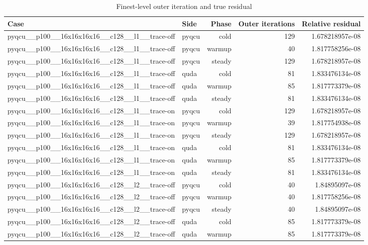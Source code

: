 \begin{table}[htbp]
\centering
\caption{Finest-level outer iteration and true residual}
\small
\begin{tabular}{@{}llrrr@{}}
\toprule
Case & Side & Phase & Outer iterations & Relative residual \\
\midrule
pyqcu\_\_p100\_\_16x16x16x16\_\_c128\_\_l1\_\_trace-off & pyqcu & cold & 129 & 1.678218957e-08 \\
pyqcu\_\_p100\_\_16x16x16x16\_\_c128\_\_l1\_\_trace-off & pyqcu & warmup & 40 & 1.817758256e-08 \\
pyqcu\_\_p100\_\_16x16x16x16\_\_c128\_\_l1\_\_trace-off & pyqcu & steady & 129 & 1.678218957e-08 \\
pyqcu\_\_p100\_\_16x16x16x16\_\_c128\_\_l1\_\_trace-off & quda & cold & 81 & 1.833476134e-08 \\
pyqcu\_\_p100\_\_16x16x16x16\_\_c128\_\_l1\_\_trace-off & quda & warmup & 85 & 1.817773379e-08 \\
pyqcu\_\_p100\_\_16x16x16x16\_\_c128\_\_l1\_\_trace-off & quda & steady & 81 & 1.833476134e-08 \\
pyqcu\_\_p100\_\_16x16x16x16\_\_c128\_\_l1\_\_trace-on & pyqcu & cold & 129 & 1.678218957e-08 \\
pyqcu\_\_p100\_\_16x16x16x16\_\_c128\_\_l1\_\_trace-on & pyqcu & warmup & 39 & 1.817754938e-08 \\
pyqcu\_\_p100\_\_16x16x16x16\_\_c128\_\_l1\_\_trace-on & pyqcu & steady & 129 & 1.678218957e-08 \\
pyqcu\_\_p100\_\_16x16x16x16\_\_c128\_\_l1\_\_trace-on & quda & cold & 81 & 1.833476134e-08 \\
pyqcu\_\_p100\_\_16x16x16x16\_\_c128\_\_l1\_\_trace-on & quda & warmup & 85 & 1.817773379e-08 \\
pyqcu\_\_p100\_\_16x16x16x16\_\_c128\_\_l1\_\_trace-on & quda & steady & 81 & 1.833476134e-08 \\
pyqcu\_\_p100\_\_16x16x16x16\_\_c128\_\_l2\_\_trace-off & pyqcu & cold & 40 & 1.84895097e-08 \\
pyqcu\_\_p100\_\_16x16x16x16\_\_c128\_\_l2\_\_trace-off & pyqcu & warmup & 40 & 1.817758256e-08 \\
pyqcu\_\_p100\_\_16x16x16x16\_\_c128\_\_l2\_\_trace-off & pyqcu & steady & 40 & 1.84895097e-08 \\
pyqcu\_\_p100\_\_16x16x16x16\_\_c128\_\_l2\_\_trace-off & quda & cold & 85 & 1.817773379e-08 \\
pyqcu\_\_p100\_\_16x16x16x16\_\_c128\_\_l2\_\_trace-off & quda & warmup & 85 & 1.817773379e-08 \\

\end{tabular}
\end{table}
